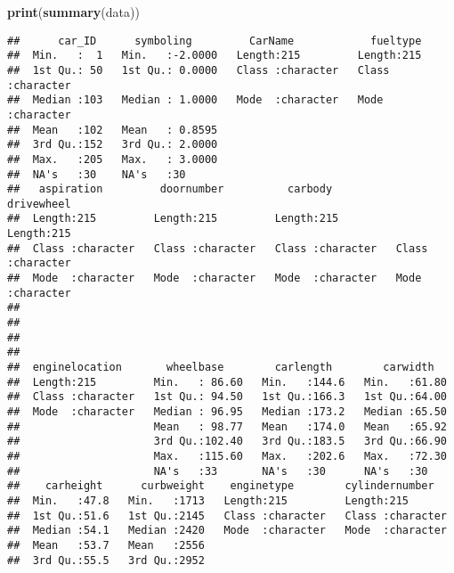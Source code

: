 \documentclass[
]{article}
\newenvironment{Shaded}{\begin{snugshade}}{\end{snugshade}}
\newcommand{\FunctionTok}[1]{\textcolor[rgb]{0.13,0.29,0.53}{\textbf{#1}}}
\newcommand{\NormalTok}[1]{#1}
\begin{document}
\begin{Shaded}
\begin{Highlighting}[]
\FunctionTok{print}\NormalTok{(}\FunctionTok{summary}\NormalTok{(data))}
\end{Highlighting}
\end{Shaded}

\begin{verbatim}
##      car_ID      symboling         CarName            fueltype        
##  Min.   :  1   Min.   :-2.0000   Length:215         Length:215        
##  1st Qu.: 50   1st Qu.: 0.0000   Class :character   Class :character  
##  Median :103   Median : 1.0000   Mode  :character   Mode  :character  
##  Mean   :102   Mean   : 0.8595                                        
##  3rd Qu.:152   3rd Qu.: 2.0000                                        
##  Max.   :205   Max.   : 3.0000                                        
##  NA's   :30    NA's   :30                                             
##   aspiration         doornumber          carbody           drivewheel       
##  Length:215         Length:215         Length:215         Length:215        
##  Class :character   Class :character   Class :character   Class :character  
##  Mode  :character   Mode  :character   Mode  :character   Mode  :character  
##                                                                             
##                                                                             
##                                                                             
##                                                                             
##  enginelocation       wheelbase        carlength        carwidth    
##  Length:215         Min.   : 86.60   Min.   :144.6   Min.   :61.80  
##  Class :character   1st Qu.: 94.50   1st Qu.:166.3   1st Qu.:64.00  
##  Mode  :character   Median : 96.95   Median :173.2   Median :65.50  
##                     Mean   : 98.77   Mean   :174.0   Mean   :65.92  
##                     3rd Qu.:102.40   3rd Qu.:183.5   3rd Qu.:66.90  
##                     Max.   :115.60   Max.   :202.6   Max.   :72.30  
##                     NA's   :33       NA's   :30      NA's   :30     
##    carheight      curbweight    enginetype        cylindernumber    
##  Min.   :47.8   Min.   :1713   Length:215         Length:215        
##  1st Qu.:51.6   1st Qu.:2145   Class :character   Class :character  
##  Median :54.1   Median :2420   Mode  :character   Mode  :character  
##  Mean   :53.7   Mean   :2556                                        
##  3rd Qu.:55.5   3rd Qu.:2952                                        

\end{verbatim}
\end{document}
